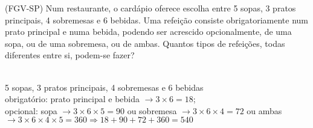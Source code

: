 \begin{ex}
 (FGV-SP) Num restaurante, o cardápio oferece escolha entre 5 sopas, 3 pratos principais, 4 sobremesas e 6 bebidas. Uma refeição consiste obrigatoriamente num prato principal e numa bebida, podendo ser acrescido opcionalmente, de uma sopa, ou de uma sobremesa, ou de ambas. Quantos tipos de refeições, todas diferentes entre si, podem-se fazer?
\begin{sol}
  \phantom{A} \\
 5 sopas, 3 pratos principais, 4 sobremesas e 6 bebidas \\
 obrigatório: prato principal e bebida $\rightarrow3 \times6=18$;\\
 opcional: sopa $\rightarrow3\times6\times5=90$ ou sobremesa $\rightarrow3\times6\times4=72$ ou ambas $\rightarrow3\times6\times4\times5=360 
 \Longrightarrow18+90+72+360=540$
\end{sol}
\end{ex}